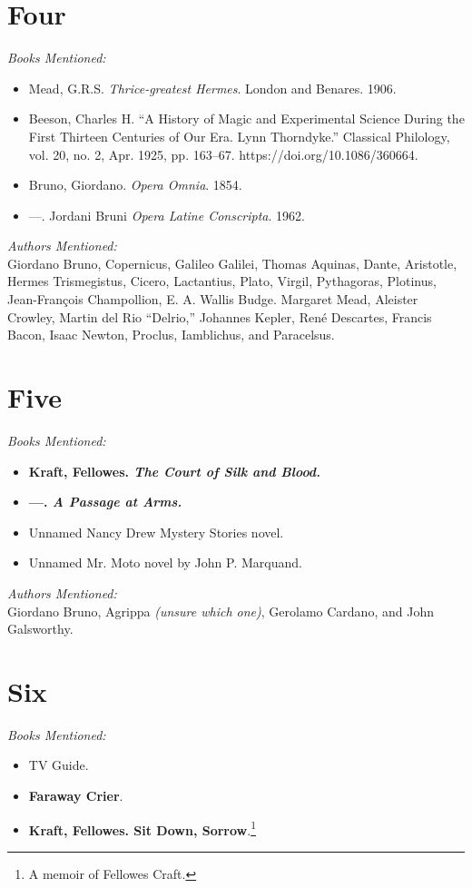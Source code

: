 \documentclass[twoside,10pt]{report}
\begin{document}
\section{Four}
\textit{Books Mentioned:}
\begin{itemize}
\item Mead, G.R.S. \textit{Thrice-greatest Hermes}. London and Benares. 1906.\cite{Mead1906}
\item Beeson, Charles H. “A History of Magic and Experimental Science During the First Thirteen Centuries of Our Era. Lynn Thorndyke.” Classical Philology, vol. 20, no. 2, Apr. 1925, pp. 163–67. https://doi.org/10.1086/360664.\cite{Beeson1925}
\item Bruno, Giordano. \textit{Opera Omnia}. 1854.\cite{Bruno1854}
\item —. Jordani Bruni \textit{Opera Latine Conscripta}. 1962.\cite{Bruno1962}
\end{itemize}
\textit{Authors Mentioned:}\\
Giordano Bruno, Copernicus, Galileo Galilei, Thomas Aquinas, Dante, Aristotle, Hermes Trismegistus, Cicero, Lactantius, Plato, Virgil, Pythagoras, Plotinus, Jean-François Champollion, E. A. Wallis Budge. Margaret Mead, Aleister Crowley, Martin del Rio “Delrio,” Johannes Kepler, René Descartes, Francis Bacon, Isaac Newton, Proclus, Iamblichus, and Paracelsus.

\section{Five}
\textit{Books Mentioned:}
\begin{itemize}
\item \textbf{Kraft, Fellowes. \textit{The Court of Silk and Blood.}}
\item \textbf{—. \textit{A Passage at Arms.}}
\item Unnamed Nancy Drew Mystery Stories novel.
\item Unnamed Mr. Moto novel by John P. Marquand.
\end{itemize}
\textit{Authors Mentioned:}\\
Giordano Bruno, Agrippa \textit{(unsure which one)}, Gerolamo Cardano, and John Galsworthy.

\section{Six}
\textit{Books Mentioned:}
\begin{itemize}
\item TV Guide.
\item \textbf{Faraway Crier}.
\item \textbf{Kraft, Fellowes. Sit Down, Sorrow}.\footnote{A memoir of Fellowes Craft.}
\end{itemize}
\end{document}
